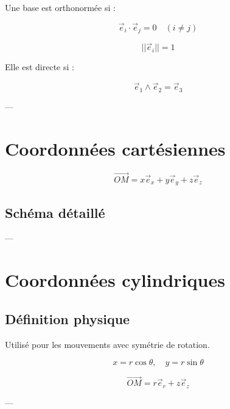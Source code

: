 \documentclass[11pt,a4paper]{article}
\begin{document}
Une base est orthonormée si :

\[
\vec{e}_i \cdot \vec{e}_j = 0 \quad (i \neq j)
\]

\[
||\vec{e}_i|| = 1
\]

Elle est directe si :

\[
\vec{e}_1 \wedge \vec{e}_2 = \vec{e}_3
\]

---

\section{Coordonnées cartésiennes}

\[
\vec{OM} = x\vec{e}_x + y\vec{e}_y + z\vec{e}_z
\]

\subsection{Schéma détaillé}

\begin{center}
\end{center}

---

\section{Coordonnées cylindriques}

\subsection{Définition physique}

Utilisé pour les mouvements avec symétrie de rotation.

\[
x = r\cos\theta, \quad y = r\sin\theta
\]

\[
\vec{OM} = r\vec{e}_r + z\vec{e}_z
\]

---
\end{document}

